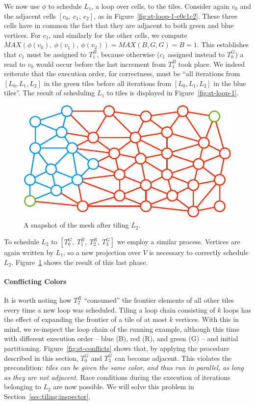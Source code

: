 We now use $\phi$ to schedule $L_1$, a loop over cells, to the tiles. Consider again $v_0$ and the adjacent cells $[c_0,\ c_1,\ c_2]$, as in Figure~\ref{fig:st-loop-1-c0c1c2}. These three cells have in common the fact that they are adjacent to both green and blue vertices. For $c_1$, and similarly for the other cells, we compute $MAX(\phi(v_0),\ \phi(v_1),\ \phi(v_2)) = MAX(B, G, G) = B = 1$. This establishes that $c_1$ must be assigned to $T_1^B$, because otherwise ($c_1$ assigned instead to $T_0^G$) a read to $v_0$ would occur before the last increment from $T_1^B$ took place. We indeed reiterate that the execution order, for correctness, must be ``all iterations from $[L_0, L_1, L_2]$ in the green tiles before all iterations from $[L_0, L_1, L_2]$ in the blue tiles''. The result of scheduling $L_1$ to tiles is displayed in Figure~\ref{fig:st-loop-1}.

\begin{figure}[h]
\centering
\includegraphics[scale=0.6]{sparsetiling/figures/loop_2.pdf}
\caption{A snapshot of the mesh after tiling $L_2$.}
\label{fig:st-loop-2}
\end{figure}

To schedule $L_2$ to $[T_0^G,\ T_1^B,\ T_2^R,\ T_3^G]$ we employ a similar process. Vertices are again written by $L_1$, so a new projection over $V$ is necessary to correctly schedule $L_2$. Figure~\ref{fig:st-loop-2} shows the result of this last phase. 



\paragraph{Conflicting Colors}
It is worth noting how $T_2^R$ ``consumed'' the frontier elements of all other tiles every time a new loop was scheduled. Tiling a loop chain consisting of $k$ loops has the effect of expanding the frontier of a tile of at most $k$ vertices. With this in mind, we re-inspect the loop chain of the running example, although this time with different execution order -- blue (B), red (R), and green (G) -- and initial partitioning. Figure~\ref{fig:st-conflicts} shows that, by applying the procedure described in this section, $T_0^G$ and $T_3^G$ can become adjacent. This violates the precondition: {\it tiles can be given the same color, and thus run in parallel, as long as they are not adjacent}. Race conditions during the execution of iterations belonging to $L_2$ are now possible. We will solve this problem in Section~\ref{sec:tiling:inspector}.

